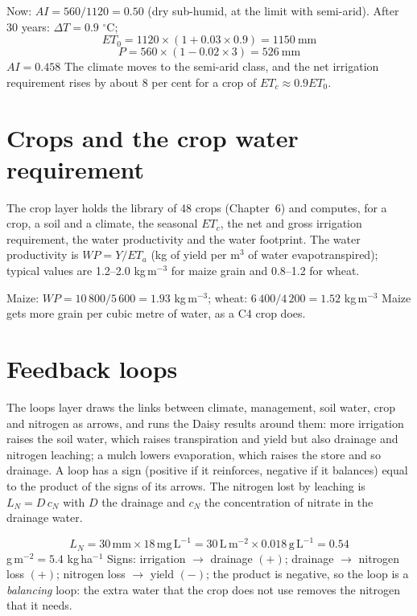 \sol {}\ans Now: $AI=560/1120=0.50$ (dry sub-humid, at the limit with semi-arid). After 30 years: $\Delta T=0.9$ $^\circ$C; \[ET_0=1120\times(1+0.03\times0.9)=1150\ \text{mm}\]
\[P=560\times(1-0.02\times3)=526\ \text{mm}\]
$AI=0.458$ \ans The climate moves to the semi-arid class, and the net irrigation requirement rises by about 8 per cent for a crop of $ET_c\approx0.9ET_0$. \finans

\section{Crops and the crop water requirement}
The crop layer holds the library of 48 crops (Chapter~6) and computes, for a crop, a soil and a climate, the seasonal $ET_c$, the net and gross irrigation requirement, the water productivity and the water footprint. The water productivity is $WP=Y/ET_a$ (kg of yield per m$^3$ of water evapotranspired); typical values are 1.2--2.0 kg\,m$^{-3}$ for maize grain and 0.8--1.2 for wheat.

\sol {}\ans Maize: $WP=10\,800/5\,600=1.93$ kg\,m$^{-3}$; wheat: $6\,400/4\,200=1.52$ kg\,m$^{-3}$ \ans Maize gets more grain per cubic metre of water, as a C4 crop does. \finans

\section{Feedback loops}
The loops layer draws the links between climate, management, soil water, crop and nitrogen as arrows, and runs the Daisy results around them: more irrigation raises the soil water, which raises transpiration and yield but also drainage and nitrogen leaching; a mulch lowers evaporation, which raises the store and so drainage. A loop has a sign (positive if it reinforces, negative if it balances) equal to the product of the signs of its arrows. The nitrogen lost by leaching is $L_N=D\,c_N$ with $D$ the drainage and $c_N$ the concentration of nitrate in the drainage water.

\sol \[L_N=30\,\mathrm{mm}\times18\,\mathrm{mg\,L^{-1}}=30\,\mathrm{L\,m^{-2}}\times0.018\,\mathrm{g\,L^{-1}}=0.54\] g\,m$^{-2}=5.4$ kg\,ha$^{-1}$ \ans Signs: irrigation $\to$ drainage $(+)$; drainage $\to$ nitrogen loss $(+)$; nitrogen loss $\to$ yield $(-)$; the product is negative, so the loop is a \emph{balancing} loop: the extra water that the crop does not use removes the nitrogen that it needs. \finans

